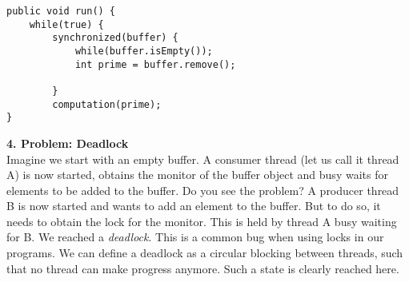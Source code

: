 \documentclass[main.tex]{subfiles}
\begin{document}
\begin{verbatim}
public void run() {
    while(true) {
        synchronized(buffer) {
            while(buffer.isEmpty());
            int prime = buffer.remove();

        }
        computation(prime);
}
\end{verbatim}
\textbf{4. Problem: Deadlock}\\
Imagine we start with an empty buffer. A consumer thread (let us call it thread A) is now started, obtains the monitor of the buffer object and busy waits for elements to be added to the buffer. Do you see the problem? A producer thread B is now started and wants to add an element to the buffer. But to do so, it needs to obtain the lock for the monitor. This is held by thread A busy waiting for B. We reached a \textit{deadlock}. This is a common bug when using locks in our programs. We can define a deadlock as a circular blocking between threads, such that no thread can make progress anymore. Such a state is clearly reached here.
\end{document}
